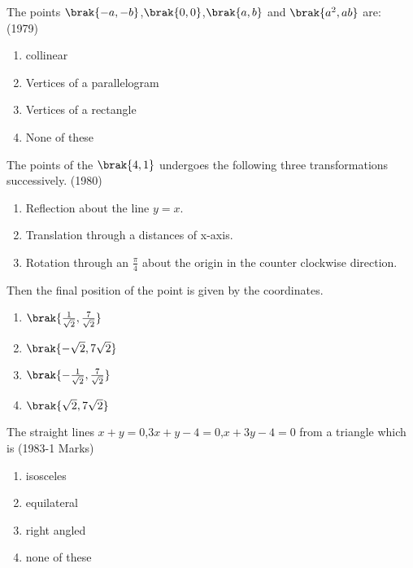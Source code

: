 \iffalse
\title{Straight Lines and Pair of Straight Lines}
\author{EE24BTECH11041 - Mohit}
\section {mcq-single}
\fi
	\item The points $\brak{-a,-b}$,$\brak{0,0}$,$\brak{a,b}$ and $\brak{a^2,ab}$ are:
    \hfill(1979)
    \begin{enumerate}
        \item collinear
        \item Vertices of a parallelogram
        \item Vertices of a rectangle 
        \item None of these
    \end{enumerate}
    \item The points of the $\brak{4,1}$ undergoes the following three transformations successively.
    \hfill(1980)
    \begin{enumerate}
        \item Reflection about the line $y=x$.
        \item Translation through a distances of x-axis.
        \item Rotation through an $\frac{\pi}{4}$ about the origin in the counter clockwise direction.
    \end{enumerate}
    Then the final position of the point is given by the coordinates.
    \begin{multicols}{2} 		
    \begin{enumerate}
        \item $\brak{\frac{1}{\sqrt{2}},\frac{7}{\sqrt{2}}}$
	\item $\brak{-\sqrt{2},7\sqrt{2}}$
	\item $\brak{-\frac{1}{\sqrt{2}},\frac{7}{\sqrt{2}}}$
	\item $\brak{\sqrt{2},7\sqrt{2}}$
    \end{enumerate} 
    \end{multicols}	    
    \item The straight lines $x+y=0$,$3x+y-4=0$,$x+3y-4=0$ from a triangle which is 
    \hfill(1983-1 Marks)
    \begin{multicols}{2}	
    \begin{enumerate}
        \item isosceles
        \item equilateral 
        \item right angled
        \item none of these
    \end{enumerate}
    \end{multicols}
